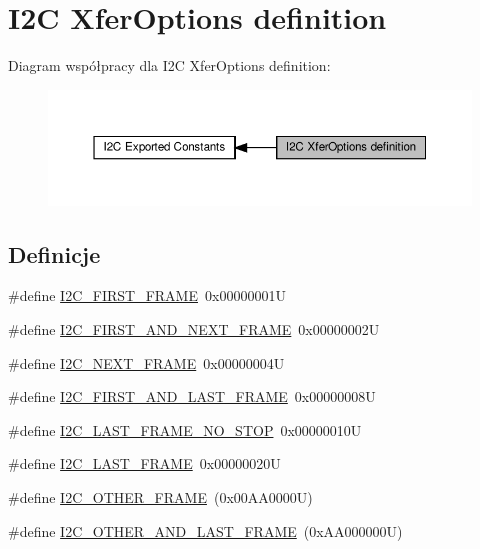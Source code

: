 \hypertarget{group___i2_c___xfer_options__definition}{}\section{I2C Xfer\+Options definition}
\label{group___i2_c___xfer_options__definition}
Diagram współpracy dla I2C Xfer\+Options definition\+:\nopagebreak
\begin{figure}[H]
\begin{center}
\leavevmode
\includegraphics[width=350pt]{group___i2_c___xfer_options__definition}
\end{center}
\end{figure}
\subsection*{Definicje}
\begin{DoxyCompactItemize}
\item 
\#define \hyperlink{group___i2_c___xfer_options__definition_gab23601bfc0eaddbc4823d193b7e49a9c}{I2\+C\+\_\+\+F\+I\+R\+S\+T\+\_\+\+F\+R\+A\+ME}~0x00000001U
\item 
\#define \hyperlink{group___i2_c___xfer_options__definition_ga1396d7236a5e1d52c9fd6d182d1f2869}{I2\+C\+\_\+\+F\+I\+R\+S\+T\+\_\+\+A\+N\+D\+\_\+\+N\+E\+X\+T\+\_\+\+F\+R\+A\+ME}~0x00000002U
\item 
\#define \hyperlink{group___i2_c___xfer_options__definition_ga8790cd8bea154c662fc6a6d6ef6b9083}{I2\+C\+\_\+\+N\+E\+X\+T\+\_\+\+F\+R\+A\+ME}~0x00000004U
\item 
\#define \hyperlink{group___i2_c___xfer_options__definition_ga56aa81e0fe6ff902f3b0dd0bc9e11b96}{I2\+C\+\_\+\+F\+I\+R\+S\+T\+\_\+\+A\+N\+D\+\_\+\+L\+A\+S\+T\+\_\+\+F\+R\+A\+ME}~0x00000008U
\item 
\#define \hyperlink{group___i2_c___xfer_options__definition_gac316c2c562991d4629151b517c2c02d8}{I2\+C\+\_\+\+L\+A\+S\+T\+\_\+\+F\+R\+A\+M\+E\+\_\+\+N\+O\+\_\+\+S\+T\+OP}~0x00000010U
\item 
\#define \hyperlink{group___i2_c___xfer_options__definition_gaf732cc5827622242ce14645f67749f40}{I2\+C\+\_\+\+L\+A\+S\+T\+\_\+\+F\+R\+A\+ME}~0x00000020U
\item 
\#define \hyperlink{group___i2_c___xfer_options__definition_gabedde3791be7cb544ffeb9e408d1980e}{I2\+C\+\_\+\+O\+T\+H\+E\+R\+\_\+\+F\+R\+A\+ME}~(0x00\+A\+A0000\+U)
\item 
\#define \hyperlink{group___i2_c___xfer_options__definition_ga272995b7f02a1e44b589cc9794093d0b}{I2\+C\+\_\+\+O\+T\+H\+E\+R\+\_\+\+A\+N\+D\+\_\+\+L\+A\+S\+T\+\_\+\+F\+R\+A\+ME}~(0x\+A\+A000000\+U)
\end{DoxyCompactItemize}


